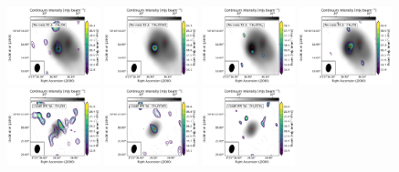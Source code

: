 \renewcommand{\thefigure}{\arabic{figure} (Cont.)}
\addtocounter{figure}{-1}
\begin{figure}[htbp!]
  \centering
  \includegraphics[width=0.24\textwidth]{./moment0/Set1_ID01_3_CH3OH_243915.pdf}
  \includegraphics[width=0.24\textwidth]{./moment0/Set1_ID01_3_CH3OCHO_259342.pdf}
  \includegraphics[width=0.24\textwidth]{./moment0/Set1_ID01_3_CH3OCH3_259311.pdf}
  \includegraphics[width=0.24\textwidth]{./moment0/Set1_ID01_3_CH3CN_257527.pdf}
  \\
  \includegraphics[width=0.24\textwidth]{./moment0/Set1_ID01_2_CH3OH_243915.pdf}
  \includegraphics[width=0.24\textwidth]{./moment0/Set1_ID01_2_CH3OCHO_259342.pdf}
  \includegraphics[width=0.24\textwidth]{./moment0/Set1_ID01_2_CH3OCH3_259311.pdf}

\end{figure}

